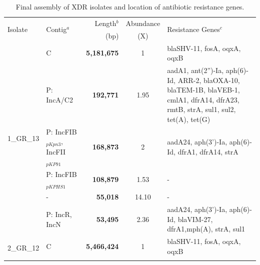 \begin{landscape}
\begin{table}[!ht]
\centering
\scriptsize
\caption{Final assembly of XDR \kp{} isolates and location of antibiotic resistance genes.}
\label{tab:assers_final}
\begin{tabular}{|l|l|r|c|p{12cm}|}
\hline
\multirow{2}{*}{\small Isolate}  & \multirow{2}{*}{\small Contig$^a$}   & {\small Length$^b$} & {\small Abundance} & \multirow{2}{*}{\small Resistance Genes$^c$}\\
 & & (bp) & (X) & \\ \hline \hline
\multirow{6}{*}{1\_GR\_13}  & C                           & \textbf{5,181,675}     & 1        & blaSHV-11, fosA, oqxA, oqxB                                                                                                                \\ \cline{2-5} 
                            & P: IncA/C2                  & \textbf{192,771}      & 1.95     & aadA1, ant(2'')-Ia, aph(6)-Id, ARR-2, blaOXA-10, blaTEM-1B, blaVEB-1, cmlA1, dfrA14, dfrA23, rmtB, strA, sul1, sul2, tet(A), tet(G)        \\ \cline{2-5} 
                            & P: IncFIB$_{pKpn3}$, IncFII$_{pKP91}$ & \textbf{168,873}      & 2        & aadA24, aph(3')-Ia, aph(6)-Id, dfrA1, dfrA14, strA                                                                                         \\ \cline{2-5} 
                            & P: IncFIB$_{pKPHS1}$             & \textbf{108,879}      & 1.53     & -                                                                                                                                          \\ \cline{2-5} 
                            & -                           & \textbf{55,018}       & 14.10    & -                                                                                                                                          \\ \cline{2-5} 
                            & P: IncR, IncN               & \textbf{53,495}       & 2.36     & aadA24, aph(3')-Ia, aph(6)-Id, blaVIM-27, dfrA1,mph(A), strA, sul1                                                                         \\ \hline \hline
\multirow{6}{*}{2\_GR\_12}  & C                           & \textbf{5,466,424}     & 1        & blaSHV-11, fosA, oqxA, oqxB                                                                                                                \\ \cline{2-5} 

\end{tabular}
\end{table}
\end{landscape}
